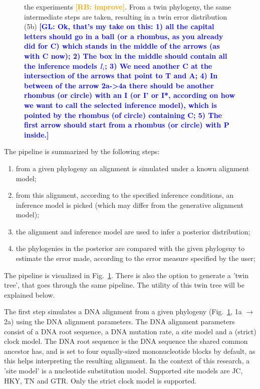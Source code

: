 \documentclass{article}
\newcommand{\giovanni}[1]{\textcolor{blue}{\textbf{[GL: #1]}}}
\newcommand{\richel}[1]{\textcolor{orange}{\textbf{[RB: #1]}}}
\begin{document}
\begin{figure}
{    the experiments \richel{improve}.
    From a twin phylogeny, the same intermediate steps are taken,
    resulting in a twin error distribution (5b)
    \giovanni{Ok, that's my take on this: 1) all the capital letters should go 
in a ball (or a rhombus, as you already did for C) which stands in the middle 
of the arrows (as with C now); 2) The box in the middle should contain all the 
inference models $I_{i}$; 3) We need another C at the intersection of the 
arrows that point to T and A; 4) In between of the arrow 2a->4a there should be 
another rhombus (or circle) with an I (or I' or I*, according on how we want to 
call the selected inference model), which is pointed by the rhombus (of circle) 
containing C; 5) The first arrow should start from a rhombus (or circle) with P 
inside.}
  }
  \label{fig:pipeline}
\end{figure}

The pipeline is summarized by the following steps:
\begin{enumerate}
  \item from a given phylogeny an alignment is simulated 
    under a known alignment model;
  \item from this alignment, according to the specified inference conditions, 
    an inference model is picked (which may differ from the 
    generative alignment model);
  \item the alignment and inference model are used 
    to infer a posterior distribution;
  \item the phylogenies in the posterior are compared with the given phylogeny 
    to estimate the error made, according to the error measure specified 
    by the user;
\end{enumerate}
The pipeline is visualized in Fig.~\ref{fig:pipeline}. 
There is also the option to generate a 'twin tree', 
that goes through the same pipeline. 
The utility of this twin tree will be explained below.

The first step simulates a DNA alignment from a given 
phylogeny (Fig.~\ref{fig:pipeline}, 1a $\rightarrow$ 2a)
using the DNA alignment parameters.
The DNA alignment parameters consist of a DNA root sequence, a DNA mutation rate,
a site model and a (strict) clock model.
The DNA root sequence is the DNA sequence the shared common ancestor has,
and is set to four equally-sized mononucleotide blocks by default, as this
helps interpreting the resulting alignment.
In the context of this research, a 'site model' is a nucleotide substitution
model. Supported site models are JC, HKY, TN and GTR. Only the strict
clock model is supported.
\end{document}
